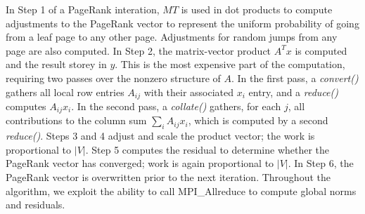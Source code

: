 In Step 1 of a PageRank interation, $MT$ is used in dot products to
compute adjustments to the PageRank vector to represent the uniform
probability of going from a leaf page to any other page.  Adjustments
for random jumps from any page are also computed.  In Step 2, the
matrix-vector product $A^T x$ is computed and the result storey in
$y$.  This is the most expensive part of the computation, requiring
two passes over the nonzero structure of $A$.  In the first pass, a
{\it convert()} gathers all local row entries $A_{ij}$ with their
associated $x_i$ entry, and a {\it reduce()} computes $A_{ij} x_i$.
In the second pass, a {\it collate()} gathers, for each $j$, all
contributions to the column sum $\sum_i A_{ij} x_i$, which is computed
by a second {\it reduce()}.  Steps 3 and 4 adjust and scale the
product vector; the work is proportional to $|V|$.  Step 5 computes
the residual to determine whether the PageRank vector has converged;
work is again proportional to $|V|$.  In Step 6, the PageRank vector
is overwritten prior to the next iteration.  Throughout the algorithm,
we exploit the ability to call MPI\_Allreduce to compute global norms
and residuals.


